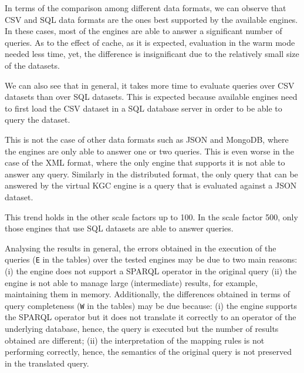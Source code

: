 In terms of the comparison among different data formats, we can observe that CSV and SQL data formats are the ones best supported by the available engines. In these cases, most of the engines are able to answer a significant number of  queries.
As to the effect of cache, as it is expected, evaluation in the warm mode needed less time, yet, the difference is insignificant due to the relatively small size of the datasets. 

We can also see that in general, it takes more time to evaluate queries over CSV datasets than over SQL datasets. This is expected because available engines need to first load the CSV dataset in a SQL database server in order to be able to query the dataset.

This is not the case of other data formats such as JSON and MongoDB, where the engines are only able to answer one or two queries. This is even worse in the case of the XML format, where the only engine that supports it is not able to answer any query. Similarly in the distributed format, the only query that can be answered by the virtual KGC engine is a query that is evaluated against a JSON dataset.

This trend holds in the other scale factors up to 100. In the scale factor 500, only those engines that use SQL datasets are able to answer queries.

Analysing the results in general, the errors obtained in the execution of the queries (\texttt{E} in the tables) over the tested engines may be due to two main reasons: (i) the engine does not support a SPARQL operator in the original query (ii) the engine is not able to manage large (intermediate) results, for example, maintaining them in memory. Additionally, the differences obtained in terms of query completeness (\texttt{W} in the tables) may be due because: (i) the engine supports the SPARQL operator but it does not translate it correctly to an operator of the underlying database, hence, the query is executed but the number of results obtained are different; (ii) the interpretation of the mapping rules is not performing correctly, hence, the semantics of the original query is not preserved in the translated query.




